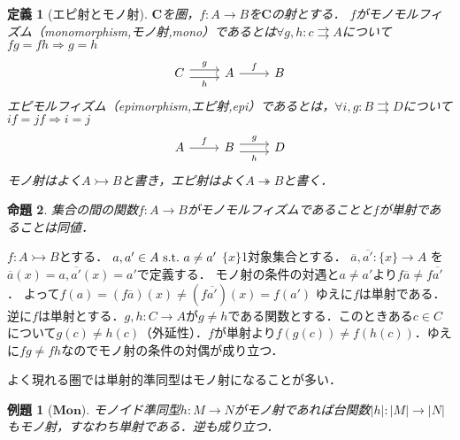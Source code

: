 \documentclass[dvipdfmx,a4j,10pt]{jsarticle}
\makeatletter
\theoremstyle{mystyle1}
\newtheorem{dfn}{定義}[section]
\newtheorem{prop}[dfn]{命題}
\theoremstyle{mystyle2}
\newtheorem{ex}{例題}
\renewenvironment{proof}[1][\proofname]{\par
  \pushQED{\qed}%
  \normalfont
  \topsep6\p@\@plus6\p@ \trivlist
  \item[\hskip\labelsep{\bfseries\sffamily #1}]\ignorespaces
}{%
  \popQED\endtrivlist\@endpefalse
}
\renewcommand\proofname{証明}
\newcommand{\Mon}{\mathbf{Mon}}
\makeatother
\begin{document}
\setcounter{dfn}{0}

\begin{dfn}[エピ射とモノ射]
	$\mathbf{C}$を圏，$f:A\to B$を$\mathbf{C}$の射とする．
	$f$がモノモルフィズム（monomorphism,モノ射,mono）であるとは$\forall g,h:c\rightrightarrows A$について$fg=fh\Rightarrow g=h$
	\begin{equation}
		\begin{tikzcd}
			C \arrow[r,yshift=0.7ex,"g"] \arrow[r,yshift=-0.7ex,"h"'] & A \arrow[r,"f"] & B
		\end{tikzcd}
	\end{equation}
	エピモルフィズム（epimorphism,エピ射,epi）であるとは，$\forall i,g:B\rightrightarrows D$について$if=jf\Rightarrow i=j$
	\begin{equation}
		\begin{tikzcd}
			A \arrow[r,"f"] & B \arrow[r,yshift=0.7ex,"g"] \arrow[r,yshift=-0.7ex,"h"'] & D
		\end{tikzcd}
	\end{equation}
	モノ射はよく$A\rightarrowtail B$と書き，エピ射はよく$A\twoheadrightarrow B$と書く．
\end{dfn}

\begin{prop}
	集合の間の関数$f:A\to B$がモノモルフィズムであることと$f$が単射であることは同値．
\end{prop}

\begin{proof}
	$f:A\rightarrowtail B$とする．
	$a,a'\in A\textrm{\,\,s.t.\,\,} a\neq a'$
	$\{x\}$1対象集合とする．
	$\overline{a},\overline{a'}:\{x\}\to A$
	を$\overline{a}(x)=a,\overline{a'}(x)=a'$で定義する．
	モノ射の条件の対遇と$a\neq a'$より$f\overline{a}\neq f\overline{a'}$．
	よって$f(a)=(f\overline{a})(x)\neq(f\overline{a'})(x)=f(a')$
	ゆえに$f$は単射である．
	逆に$f$は単射とする．$g,h:C\to A$が$g\neq h$である関数とする．このときある$c\in C$について$g(c)\neq h(c)$（外延性）．$f$が単射より$f(g(c))\neq f(h(c))$．ゆえに$fg\neq fh$なのでモノ射の条件の対偶が成り立つ．
\end{proof}

よく現れる圏では単射的準同型はモノ射になることが多い．

\begin{ex}[$\Mon$]
	モノイド準同型$h:M\to N$がモノ射であれば台関数$|h|:|M|\to|N|$もモノ射，すなわち単射である．逆も成り立つ．
\end{ex}
\end{document}
